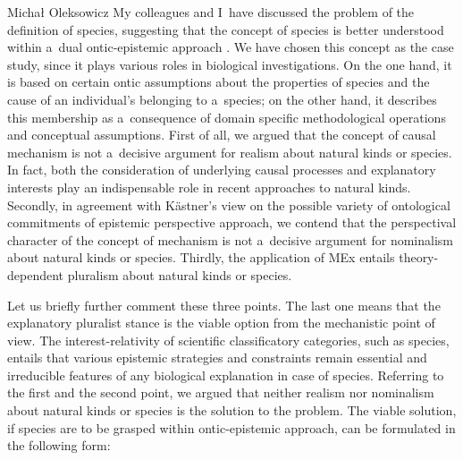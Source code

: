 \begin{artengenv}{Michał Oleksowicz}
My colleagues and I~have discussed the problem of the definition of species, suggesting that the concept of species is better understood within a~dual ontic-epistemic approach
\parencite[][]{marcacci_ontic_2023}. %
 We have chosen this concept as the case study, since it plays various roles in biological investigations. On the one hand, it is based on certain ontic assumptions about the properties of species and the cause of an individual's belonging to a~species; on the other hand, it describes this membership as a~consequence of domain specific methodological operations and conceptual assumptions. First of all, we argued that the concept of causal mechanism is not a~decisive argument for realism about natural kinds or species. In fact, both the consideration of underlying causal processes and explanatory interests play an indispensable role in recent approaches to natural kinds. Secondly, in agreement with Kästner's view on the possible variety of ontological commitments of epistemic perspective approach, we contend that the perspectival character of the concept of mechanism is not a~decisive argument for nominalism about natural kinds or species. Thirdly, the application of MEx entails theory-dependent pluralism about natural kinds or species.

Let us briefly further comment these three points. The last one means that the explanatory pluralist stance is the viable option from the mechanistic point of view. The interest-relativity of scientific classificatory categories, such as species, entails that various epistemic strategies and constraints remain essential and irreducible features of any biological explanation in case of species. Referring to the first and the second point, we argued that neither realism nor nominalism about natural kinds or species is the solution to the problem. The viable solution, if species are to be grasped within ontic-epistemic approach, can be formulated in the following form:



\end{artengenv}
